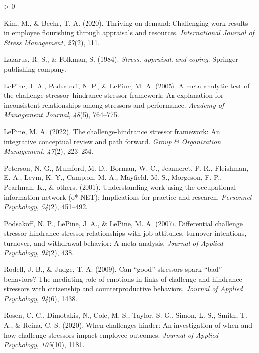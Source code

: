 \documentclass[
  english,
  man]{apa6}
\newlength{\cslhangindent}
\newenvironment{CSLReferences}[2] %
 {%
  \setlength{\parindent}{0pt}
  \ifodd #1 \everypar{\setlength{\hangindent}{\cslhangindent}}\ignorespaces\fi
  \ifnum #2 > 0
  \setlength{\parskip}{#2\baselineskip}
  \fi
 }%
 {}
\begin{document}
\begin{CSLReferences}{1}{0}
\leavevmode\hypertarget{ref-kim2020thriving}{}%
Kim, M., \& Beehr, T. A. (2020). Thriving on demand: Challenging work results in employee flourishing through appraisals and resources. \emph{International Journal of Stress Management}, \emph{27}(2), 111.

\leavevmode\hypertarget{ref-lazarus1984stress}{}%
Lazarus, R. S., \& Folkman, S. (1984). \emph{Stress, appraisal, and coping}. Springer publishing company.

\leavevmode\hypertarget{ref-lepine2005meta}{}%
LePine, J. A., Podsakoff, N. P., \& LePine, M. A. (2005). A meta-analytic test of the challenge stressor--hindrance stressor framework: An explanation for inconsistent relationships among stressors and performance. \emph{Academy of Management Journal}, \emph{48}(5), 764--775.

\leavevmode\hypertarget{ref-lepine2022challenge}{}%
LePine, M. A. (2022). The challenge-hindrance stressor framework: An integrative conceptual review and path forward. \emph{Group \& Organization Management}, \emph{47}(2), 223--254.

\leavevmode\hypertarget{ref-peterson2001understanding}{}%
Peterson, N. G., Mumford, M. D., Borman, W. C., Jeanneret, P. R., Fleishman, E. A., Levin, K. Y., Campion, M. A., Mayfield, M. S., Morgeson, F. P., Pearlman, K., \& others. (2001). Understanding work using the occupational information network (o* NET): Implications for practice and research. \emph{Personnel Psychology}, \emph{54}(2), 451--492.

\leavevmode\hypertarget{ref-podsakoff2007differential}{}%
Podsakoff, N. P., LePine, J. A., \& LePine, M. A. (2007). Differential challenge stressor-hindrance stressor relationships with job attitudes, turnover intentions, turnover, and withdrawal behavior: A meta-analysis. \emph{Journal of Applied Psychology}, \emph{92}(2), 438.

\leavevmode\hypertarget{ref-rodell2009can}{}%
Rodell, J. B., \& Judge, T. A. (2009). Can {``good''} stressors spark {``bad''} behaviors? The mediating role of emotions in links of challenge and hindrance stressors with citizenship and counterproductive behaviors. \emph{Journal of Applied Psychology}, \emph{94}(6), 1438.

\leavevmode\hypertarget{ref-rosen2020challenges}{}%
Rosen, C. C., Dimotakis, N., Cole, M. S., Taylor, S. G., Simon, L. S., Smith, T. A., \& Reina, C. S. (2020). When challenges hinder: An investigation of when and how challenge stressors impact employee outcomes. \emph{Journal of Applied Psychology}, \emph{105}(10), 1181.


\end{CSLReferences}
\end{document}
